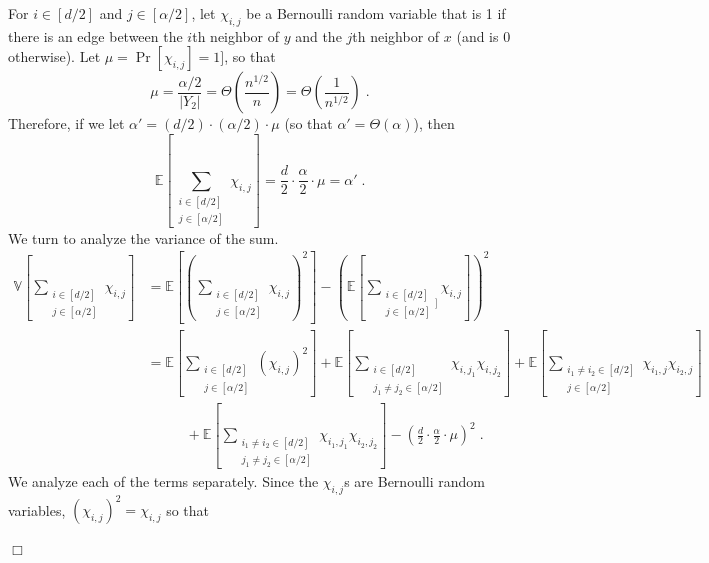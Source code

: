 \documentclass{article}
\newcommand{\Ex}{\mathbb{E}}
\newcommand{\Var}{\mathbb{V}}
\newenvironment{proofof}[1]{\smallskip\noindent{\bf Proof of #1:}}%
        {\hspace*{\fill}$\Box$\par}
\newcommand{\commentt}[1]{ {}}
\begin{document}
\begin{proofof}{Claim~\ref{clm:Pr-Es}}
For $i\in [d/2]$  and $j \in [\alpha/2]$, let $\chi_{i,j}$ be a Bernoulli random variable that is 1 if there is an edge between the $i$th neighbor of $y$ and the $j$th neighbor of $x$ (and is 0 otherwise). Let  $\mu = \Pr[\chi_{i,j}]=1]$, so that
\begin{equation}
\mu = %
   \frac{\alpha/2}{|Y_2|} %
   = \Theta\left(\frac{n^{1/2}}{n}\right) = \Theta\left(\frac{1}{n^{1/2}}\right)\;.
\end{equation}
Therefore, if we let $\alpha' = (d/2)\cdot(\alpha/2)\cdot \mu$ (so that $\alpha' = \Theta(\alpha)$), then
\begin{equation}
\Ex\left[\sum_{\substack{i\in [d/2] \\ j\in [\alpha/2]}}\chi_{i,j}\right] = \frac{d}{2}\cdot\frac{\alpha}{2}\cdot \mu = \alpha'\;.
\end{equation}
We turn to analyze the variance of the sum.
\begin{align}
\Var\left[\sum_{\substack{i\in [d/2] \\ j\in [\alpha/2]}}\chi_{i,j}\right] & =
\Ex\left[\left(\sum_{\substack{i\in [d/2] \\ j\in [\alpha/2]}}\chi_{i,j}\right)^2\right] - \left(\Ex\left[\sum_{\substack{i\in [d/2] \\ j\in [\alpha/2]}]}\chi_{i,j}\right]\right)^2 \\
& =
\Ex\left[\sum_{\substack{i\in [d/2] \\ j\in [\alpha/2]}} (\chi_{i,j})^2\right] +
\Ex\left[\sum_{\substack{i\in [d/2] \\ j_1\neq j_2 \in [\alpha/2]}}\chi_{i,j_1}\chi_{i,j_2}\right]
+ \Ex\left[\sum_{\substack{i_1\neq i_2\in [d/2] \\ j\in  [\alpha/2]}}\chi_{i_1,j}\chi_{i_2,j}\right] \nonumber \\
&\;\;\;\;\;\;\;\;\;\;+ %
\Ex\left[\sum_{\substack{i_1\neq i_2\in [d/2] \\ j_1\neq j_2\in  [\alpha/2]}}\chi_{i_1,j_1}\chi_{i_2,j_2}\right] - \left(\frac{d}{2}\cdot\frac{\alpha}{2}\cdot \mu\right)^2 \;.
\label{eq:var-lb}
\end{align}
We analyze each of the terms separately.
Since the $\chi_{i,j}$s are Bernoulli random variables,
$(\chi_{i,j})^2 = \chi_{i,j}$ so that

\end{proofof}
\end{document}
